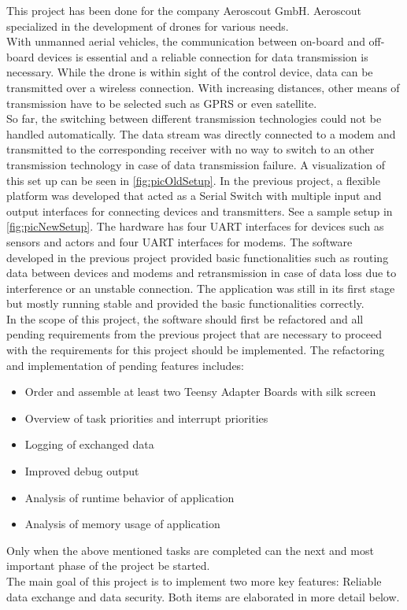 %
\label{sec:txtAufgabenstellung}
This project has been done for the company Aeroscout GmbH. Aeroscout specialized in the development of drones for various needs. \\
With unmanned aerial vehicles, the communication between on-board and off-board devices is essential and a reliable connection for data transmission is necessary. While the drone is within sight of the control device, data can be transmitted over a wireless connection. With increasing distances, other means of transmission have to be selected such as GPRS or even satellite.\\
So far, the switching between different transmission technologies could not be handled automatically. The data stream was directly connected to a modem and transmitted to the corresponding receiver with no way to switch to an other transmission technology in case of data transmission failure. A visualization of this set up can be seen in \autoref{fig:picOldSetup}.
%
%
In the previous project, a flexible platform was developed that acted as a Serial Switch with multiple input and output interfaces for connecting devices and transmitters. See a sample setup in \autoref{fig:picNewSetup}. The hardware has four UART interfaces for devices such as sensors and actors and four UART interfaces for modems. The software developed in the previous project provided basic functionalities such as routing data between devices and modems and retransmission in case of data loss due to interference or an unstable connection. The application was still in its first stage but mostly running stable and provided the basic functionalities correctly.\\
In the scope of this project, the software should first be refactored and all pending requirements from the previous project that are necessary to proceed with the requirements for this project should be implemented. The  refactoring and implementation of pending features includes: \begin{itemize}
    \item Order and assemble at least two Teensy Adapter Boards with silk screen
    \item Overview of task priorities and interrupt priorities
    \item Logging of exchanged data
    \item Improved debug output
    \item Analysis of runtime behavior of application
    \item Analysis of memory usage of application
\end{itemize}
Only when the above mentioned tasks are completed can the next and most important phase of the project be started.\\
The main goal of this project is to implement two more key features: Reliable data exchange and data security. Both items are elaborated in more detail below.
%
%
%
